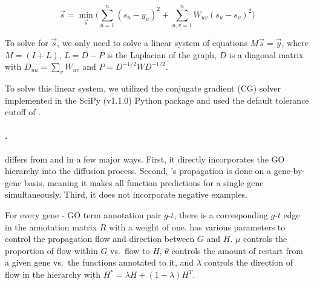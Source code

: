 \begin{equation}
    \vec{s} = \min \limits_{\vec{s}} \bigg( \sum_{u=1}^{n} (s_u - y_u)^2 + \sum_{u,v=1}^{n} W_{uv}(s_u - s_v)^2 \bigg)
\end{equation}

To solve for $\vec{s}$, we only need to solve a linear system of equations $M\vec{s} = \vec{y}$, where $M = (I + L)$, $L = D - P$ is the Laplacian of the graph, $D$ is a diagonal matrix with $D_{uu} = \sum_v W_{uv}$ and $P = D^{-1/2} W D^{-1/2}$.

To solve this linear system, we utilized the conjugate gradient (CG) solver implemented in the SciPy (v1.1.0) Python package and used the default tolerance cutoff of . 

\paragraph{\birgrank.}
\birgrank differs from \sinksource and \genemania in a few major ways. 
First, it directly incorporates the GO hierarchy into the diffusion process.
Second, \birgrank{}'s propagation is done on a gene-by-gene basis, meaning it makes all function predictions for a single gene simultaneously. Third, it does not incorporate negative examples.

For every gene - GO term annotation pair $g$-$t$, there is a corresponding $g$-$t$ edge in the annotation matrix $R$ with a weight of one.
\birgrank has various parameters to control the propagation flow and direction between $G$ and $H$. $\mu$ controls the proportion of flow within $G$ vs.\ flow to $H$, $\theta$ controls the amount of restart from a given gene vs.\ the functions annotated to it, and $\lambda$ controls the direction of flow in the hierarchy with $H^* = \lambda H + (1 - \lambda)H^T$.

